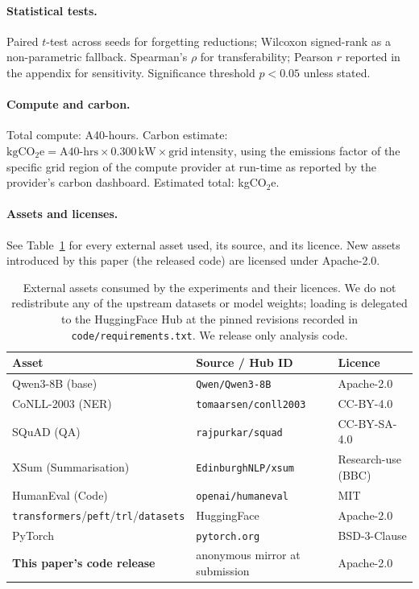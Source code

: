 \paragraph{Statistical tests.} Paired $t$-test across seeds for forgetting reductions; Wilcoxon signed-rank as a non-parametric fallback. Spearman's $\rho$ for \fvs{} transferability; Pearson $r$ reported in the appendix for sensitivity. Significance threshold $p<0.05$ unless stated.

\paragraph{Compute and carbon.} Total compute:  A40-hours. Carbon estimate: $\mathrm{kgCO_2e} = \mathrm{A40\text{-}hrs} \times 0.300\,\mathrm{kW} \times \mathrm{grid\ intensity}$, using the emissions factor of the specific grid region of the compute provider at run-time as reported by the provider's carbon dashboard. Estimated total:  kgCO$_2$e.

\paragraph{Assets and licenses.} See Table~\ref{tab:assets} for every external asset used, its source, and its licence. New assets introduced by this paper (the released code) are licensed under Apache-2.0.
\begin{table}[h]
  \centering
  \small
  \begin{tabular}{lll}
    \toprule
    Asset & Source / Hub ID & Licence \\
    \midrule
    Qwen3-8B (base)         & \texttt{Qwen/Qwen3-8B}              & Apache-2.0 \\
    CoNLL-2003 (NER)        & \texttt{tomaarsen/conll2003}        & CC-BY-4.0 \\
    SQuAD (QA)              & \texttt{rajpurkar/squad}            & CC-BY-SA-4.0 \\
    XSum (Summarisation)    & \texttt{EdinburghNLP/xsum}          & Research-use (BBC) \\
    HumanEval (Code)        & \texttt{openai/humaneval}           & MIT \\
    \texttt{transformers}/\texttt{peft}/\texttt{trl}/\texttt{datasets} & HuggingFace & Apache-2.0 \\
    PyTorch                 & \texttt{pytorch.org}                & BSD-3-Clause \\
    \midrule
    \textbf{This paper's code release} & anonymous mirror at submission & Apache-2.0 \\
    \bottomrule
  \end{tabular}
  \caption{External assets consumed by the experiments and their licences.
  We do not redistribute any of the upstream datasets or model weights;
  loading is delegated to the HuggingFace Hub at the pinned revisions
  recorded in \texttt{code/requirements.txt}. We release only analysis code.}
  \label{tab:assets}
\end{table}
